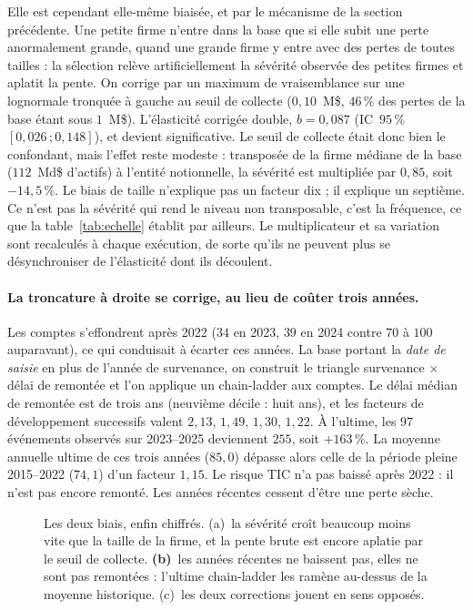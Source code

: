 Elle est cependant elle-même biaisée, et par le mécanisme de la section précédente. Une
petite firme n'entre dans la base que si elle subit une perte anormalement grande, quand une
grande firme y entre avec des pertes de toutes tailles : la sélection relève artificiellement
la sévérité observée des petites firmes et aplatit la pente. On corrige par un
maximum de vraisemblance sur une lognormale tronquée à gauche au seuil de collecte
($0{,}10$~M\$, $46\,\%$ des pertes de la base étant sous $1$~M\$). L'élasticité corrigée
double, $b=0{,}087$ (IC~$95\,\%$ $[0{,}026\,;0{,}148]$), et devient significative. Le seuil de
collecte était donc bien le confondant, mais l'effet reste modeste : transposée de la
firme médiane de la base ($112$~Md\$ d'actifs) à l'entité notionnelle, la sévérité est
multipliée par $0{,}85$, soit $-14{,}5\,\%$. Le biais de taille n'explique pas un facteur dix ; il
explique un septième. Ce n'est pas la sévérité qui rend le niveau non transposable,
c'est la fréquence, ce que la table~\ref{tab:echelle} établit par ailleurs. Le multiplicateur
et sa variation sont recalculés à chaque exécution, de sorte qu'ils ne peuvent plus se
désynchroniser de l'élasticité dont ils découlent.

\paragraph{La troncature à droite se corrige, au lieu de coûter trois années.} Les comptes
s'effondrent après 2022 ($34$ en 2023, $39$ en 2024 contre $70$ à $100$ auparavant), ce qui
conduisait à écarter ces années. La base portant la \emph{date de saisie} en plus de l'année
de survenance, on construit le triangle survenance $\times$ délai de remontée et l'on applique
un chain-ladder aux comptes. Le délai médian de remontée est de trois ans
(neuvième décile : huit ans), et les facteurs de développement successifs valent $2{,}13$,
$1{,}49$, $1{,}30$, $1{,}22$. À l'ultime, les $97$ événements observés sur 2023--2025
deviennent $255$, soit $+163\,\%$. La moyenne annuelle ultime de ces trois années
($85{,}0$) dépasse alors celle de la période pleine 2015--2022 ($74{,}1$) d'un facteur
$1{,}15$. Le risque TIC n'a pas baissé après 2022 : il n'est pas encore
remonté. Les années récentes cessent d'être une perte sèche.

\begin{figure}[htbp]\centering
{}
\caption{Les deux biais, enfin chiffrés. (a)~la sévérité croît beaucoup moins vite
que la taille de la firme, et la pente brute est encore aplatie par le seuil de collecte.
\textbf{(b)}~les années récentes ne baissent pas, elles ne sont pas remontées : l'ultime
chain-ladder les ramène au-dessus de la moyenne historique. (c)~les deux corrections
jouent en sens opposés.}
\label{fig:biais}
\end{figure}

